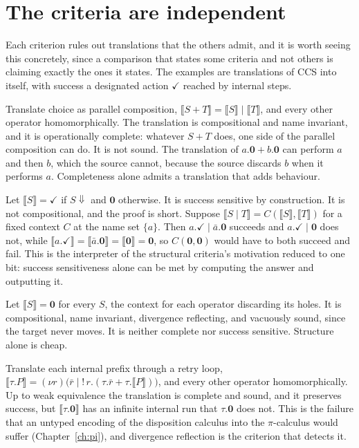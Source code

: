 \documentclass[11pt,openany]{book}
\theoremstyle{remark}
\begin{document}
\section{The criteria are independent}

Each criterion rules out translations that the others admit, and it is
worth seeing this concretely, since a comparison that states some criteria
and not others is claiming exactly the ones it states. The examples are
translations of CCS into itself, with success a designated action
$\checkmark$ reached by internal steps.

\begin{description}[leftmargin=1.5em,style=nextline]
\item[Complete but not sound.] Translate choice as parallel composition,
$\llbracket S+T\rrbracket=\llbracket S\rrbracket\mid\llbracket T\rrbracket$,
and every other operator homomorphically. The translation is
compositional and name invariant, and it is operationally complete:
whatever $S+T$ does, one side of the parallel composition can do. It is
not sound. The translation of $a.\mathbf 0+b.\mathbf 0$ can perform $a$
and then $b$, which the source cannot, because the source discards $b$ when
it performs $a$. Completeness alone admits a translation that adds
behaviour.
\item[Success sensitive but not compositional.] Let
$\llbracket S\rrbracket=\checkmark$ if $S\Downarrow$ and $\mathbf 0$
otherwise. It is success sensitive by construction. It is not
compositional, and the proof is short. Suppose $\llbracket S\mid
T\rrbracket=C(\llbracket S\rrbracket,\llbracket T\rrbracket)$ for a fixed
context $C$ at the name set $\{a\}$. Then $a.\checkmark\mid\bar a.\mathbf
0$ succeeds and $a.\checkmark\mid\mathbf 0$ does not, while
$\llbracket a.\checkmark\rrbracket=\llbracket\bar a.\mathbf
0\rrbracket=\llbracket\mathbf 0\rrbracket=\mathbf 0$, so $C(\mathbf
0,\mathbf 0)$ would have to both succeed and fail. This is the
interpreter of the structural criteria's motivation reduced to one bit:
success sensitiveness alone can be met by computing the answer and
outputting it.
\item[Compositional but not success sensitive.] Let $\llbracket
S\rrbracket=\mathbf 0$ for every $S$, the context for each operator
discarding its holes. It is compositional, name invariant, divergence
reflecting, and vacuously sound, since the target never moves. It is
neither complete nor success sensitive. Structure alone is cheap.
\item[Operationally corresponding but not divergence reflecting.]
Translate each internal prefix through a retry loop,
$\llbracket\tau.P\rrbracket=(\nu r)\bigl(\bar r\mid
!\,r.(\tau.\bar r+\tau.\llbracket P\rrbracket)\bigr)$, and every other
operator homomorphically. Up to weak equivalence the translation is
complete and sound, and it preserves success, but $\llbracket\tau.\mathbf
0\rrbracket$ has an infinite internal run that $\tau.\mathbf 0$ does
not. This is the failure that an untyped encoding of the disposition
calculus into the $\pi$-calculus would suffer (Chapter~\ref{ch:pi}), and
divergence reflection is the criterion that detects it.
\end{description}
\end{document}
